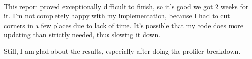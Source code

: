 \documentclass[14pt]{article}
\begin{document}
\paragraph{}
This report proved exceptionally difficult to finish, so it's good we got 2
weeks for it. I'm not completely happy with my implementation, because I had to
cut corners in a few places due to lack of time. It's possible that my code
does more updating than strictly needed, thus slowing it down.

Still, I am glad about the results, especially after doing the profiler
breakdown.
\end{document}
